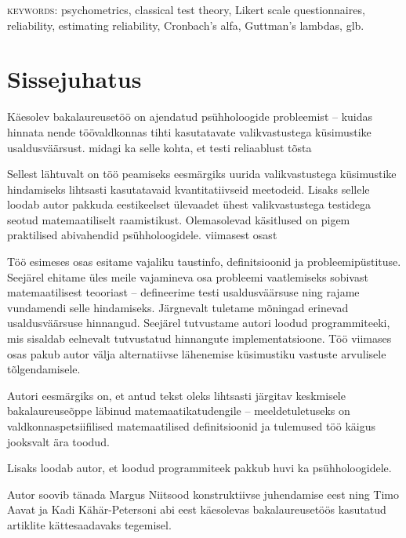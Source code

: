 \documentclass[a4paper,12pt,oneside]{article}
\numberwithin{equation}{section}
\theoremstyle{definition}
\begin{document}
\textsc{keywords:}  psychometrics, classical test theory, Likert scale questionnaires, reliability, estimating reliability, Cronbach's alfa, Guttman's lambdas, glb.

\pagebreak


\tableofcontents

\pagebreak

\section*{Sissejuhatus}

Käesolev bakalaureusetöö on ajendatud psühholoogide probleemist -- kuidas \linebreak hinnata nende töövaldkonnas tihti kasutatavate valikvastustega küsimustike usaldusväärsust. {\color{red} midagi ka selle kohta, et testi reliaablust tõsta}

Sellest lähtuvalt on töö peamiseks eesmärgiks uurida valikvastustega küsimustike hindamiseks lihtsasti kasutatavaid kvantitatiivseid meetodeid. Lisaks sellele loodab autor pakkuda eestikeelset ülevaadet ühest valikvastustega testidega seotud matemaatiliselt raamistikust. Olemasolevad käsitlused on pigem praktilised abivahendid psühholoogidele. 
{\color{red}viimasest osast}

Töö esimeses osas esitame vajaliku taustinfo, definitsioonid ja probleemipüstituse. Seejärel ehitame üles meile vajamineva osa probleemi vaatlemiseks sobivast matemaatilisest teooriast -- defineerime testi usaldusväärsuse ning rajame vundamendi selle hindamiseks. Järgnevalt tuletame mõningad erinevad usaldusväärsuse hinnangud. Seejärel tutvustame autori loodud programmiteeki, mis sisaldab eelnevalt tutvustatud hinnangute implementatsioone. Töö viimases osas pakub autor välja alternatiivse lähenemise küsimustiku vastuste arvulisele tõlgendamisele.

Autori eesmärgiks on, et antud tekst oleks lihtsasti järgitav keskmisele bakalaureuseõppe läbinud matemaatikatudengile -- meeldetuletuseks on valdkonnaspetsiifilised matemaatilised definitsioonid ja tulemused töö käigus jooksvalt ära \linebreak toodud. 

Lisaks loodab autor, et loodud programmiteek pakkub huvi ka psühholoogidele. 

Autor soovib tänada Margus Niitsood konstruktiivse juhendamise eest ning Timo Aavat ja Kadi Kähär-Petersoni abi eest käesolevas bakalaureusetöös kasutatud artiklite kättesaadavaks tegemisel.    
\end{document}
